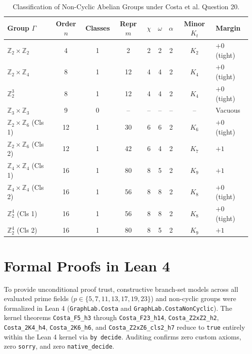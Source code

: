 \documentclass[11pt,a4paper]{article}
\theoremstyle{definition}
\begin{document}
\begin{table}[ht]
\centering
\caption{Classification of Non-Cyclic Abelian Groups under Costa et al. Question 20.}
\label{tab:noncyclic_results}
\small
\begin{tabular}{lcccccccl}
\toprule
Group $\Gamma$ & Order $n$ & Classes & Repr $m$ & $\chi$ & $\omega$ & $\alpha$ & Minor $K_t$ & Margin \\
\midrule
$\mathbb{Z}_2 \times \mathbb{Z}_2$ & 4  & 1 & 2  & 2 & 2 & 2 & $K_2$ & $+0$ (tight) \\
$\mathbb{Z}_2 \times \mathbb{Z}_4$ & 8  & 1 & 12 & 4 & 4 & 2 & $K_4$ & $+0$ (tight) \\
$\mathbb{Z}_2^3$                   & 8  & 1 & 12 & 4 & 4 & 2 & $K_4$ & $+0$ (tight) \\
$\mathbb{Z}_3 \times \mathbb{Z}_3$ & 9  & 0 & -- & --& --& --& --    & Vacuous \\
$\mathbb{Z}_2 \times \mathbb{Z}_6$ (Cls 1) & 12 & 1 & 30 & 6 & 6 & 2 & $K_6$ & $+0$ (tight) \\
$\mathbb{Z}_2 \times \mathbb{Z}_6$ (Cls 2) & 12 & 1 & 42 & 6 & 4 & 2 & $K_7$ & $+1$ \\
$\mathbb{Z}_4 \times \mathbb{Z}_4$ (Cls 1) & 16 & 1 & 80 & 8 & 5 & 2 & $K_9$ & $+1$ \\
$\mathbb{Z}_4 \times \mathbb{Z}_4$ (Cls 2) & 16 & 1 & 56 & 8 & 8 & 2 & $K_8$ & $+0$ (tight) \\
$\mathbb{Z}_2^4$ (Cls 1)                   & 16 & 1 & 56 & 8 & 8 & 2 & $K_8$ & $+0$ (tight) \\
$\mathbb{Z}_2^4$ (Cls 2)                   & 16 & 1 & 80 & 8 & 5 & 2 & $K_9$ & $+1$ \\
\bottomrule
\end{tabular}
\end{table}

\section{Formal Proofs in Lean 4}

To provide unconditional proof trust, constructive branch-set models across all evaluated prime fields ($p \in \{5, 7, 11, 13, 17, 19, 23\}$) and non-cyclic groups were formalized in Lean 4 (\texttt{GraphLab.Costa} and \texttt{GraphLab.CostaNonCyclic}).
The kernel theorems \texttt{Costa\_F5\_h3} through \texttt{Costa\_F23\_h14}, \texttt{Costa\_Z2xZ2\_h2}, \texttt{Costa\_2K4\_h4}, \texttt{Costa\_2K6\_h6}, and \texttt{Costa\_Z2xZ6\_cls2\_h7} reduce to \texttt{true} entirely within the Lean 4 kernel via \texttt{by decide}. Auditing confirms zero custom axioms, zero \texttt{sorry}, and zero \texttt{native\_decide}.
\end{document}
